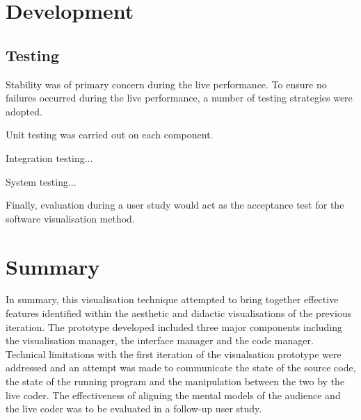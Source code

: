 \section{Development}



\subsection{Testing}

Stability was of primary concern during the live performance. To ensure no failures occurred during the live performance, a number of testing strategies were adopted. \more

Unit testing was carried out on each component.

Integration testing... \more

System testing... \more

Finally, evaluation during a user study would act as the acceptance test for the software visualisation method.

\section{Summary}

In summary, this visualisation technique attempted to bring together effective features identified within the aesthetic and didactic visualisations of the previous iteration. The prototype developed included three major components including the visualisation manager, the interface manager and the code manager. Technical limitations with the first iteration of the visualsation prototype were addressed and an attempt was made to communicate the state of the source code, the state of the running program and the manipulation between the two by the live coder. The effectiveness of aligning the mental models of the audience and the live coder was to be evaluated in a follow-up user study.


